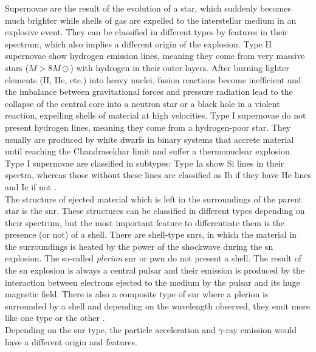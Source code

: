 \documentclass[main.tex]{subfiles}
\begin{document}
Supernovae are the result of the evolution of a star, which suddenly becomes much brighter while shells of gas are expelled to the interstellar medium in an explosive event. They can be classified in different types by features in their spectrum, which also implies a different origin of the explosion. Type II supernovae show hydrogen emission lines, meaning they come from very massive stars ($M > 8 M\odot$) with hydrogen in their outer layers. After burning lighter elements (H, He, etc.) into heavy nuclei, fusion reactions become inefficient and the imbalance between gravitational forces and pressure radiation lead to the collapse of the central core into a neutron star or a black hole in a violent reaction, expelling shells of material at high velocities. Type I supernovae do not present hydrogen lines, meaning they come from a hydrogen-poor star. They usually are produced by white dwarfs in binary systems that accrete material until reaching the Chandrasekhar limit \cite{1931Chandra} and suffer a thermonuclear explosion. Type I supernovae are classified in subtypes: Type Ia show Si lines in their spectra, whereas those without these lines are classified as Ib if they have He lines and Ic if not \cite{2006osterbrock}.\\
The structure of ejected material which is left in the surroundings of the parent star is the \gls{snr}. These structures can be classified in different types depending on their spectrum, but the most important feature to differentiate them is the presence (or not) of a shell. There are shell-type \glspl{snr}, in which the material in the surroundings is heated by the power of the shockwave during the \gls{sn} explosion. The so-called \textit{plerion} \gls{snr} or \gls{pwn} do not present a shell. The result of the \gls{sn} explosion is always a central pulsar and their emission is produced by the interaction between electrons ejected to the medium by the pulsar and its huge magnetic field. There is also a composite type of \gls{snr} where a plerion is surrounded by a shell and depending on the wavelength observed, they emit more like one type or the other \cite{1988SNR}.\\
Depending on the \gls{snr} type, the particle acceleration and $\gamma$-ray emission would have a different origin and features.
\end{document}
